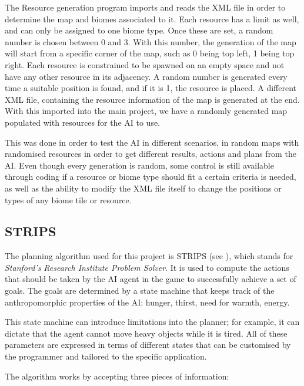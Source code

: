 \documentclass[a4paper]{report}
\begin{document}
The Resource generation program imports and reads the XML file in order to determine the map and biomes associated to it. Each resource has a limit as well, and can only be assigned to one biome type. Once these are set, a random number is chosen between 0 and 3. With this number, the generation of the map will start from a specific corner of the map, such as 0 being top left, 1 being top right. Each resource is constrained to be spawned on an empty space and not have any other resource in its adjacency. A random number is generated every time a suitable position is found, and if it is 1, the resource is placed. A different XML file, containing the resource information of the map is generated at the end. With this imported into the main project, we have a randomly generated map populated with resources for the AI to use.

This was done in order to test the AI in different scenarios, in random maps with randomised resources in order to get different results, actions and plans from the AI. Even though every generation is random, some control is still available through coding if a resource or biome type should fit a certain criteria is needed, as well as the ability to modify the XML file itself to change the positions or types of any biome tile or resource.

\subsection{STRIPS}

The planning algorithm used for this project is STRIPS (see \cite{Fikes1971189}), which stands for \emph{Stanford's Research Institute Problem Solver}. It is used to compute the actions that should be taken by the AI agent in the game to successfully achieve a set of goals. The goals are determined by a state machine that keeps track of the anthropomorphic properties of the AI: hunger, thirst, need for warmth, energy.

This state machine can introduce limitations into the planner; for example, it can dictate that the agent cannot move heavy objects while it is tired. All of these parameters are expressed in terms of different states that can be customised by the programmer and tailored to the specific application.

The algorithm works by accepting three pieces of information:
\end{document}
